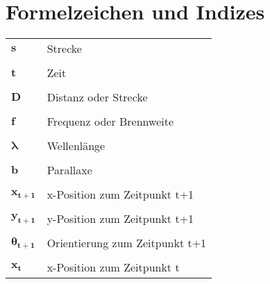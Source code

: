 \documentclass[12pt,a4paper]{scrreprt}
\begin{document}
\newpage


\section*{Formelzeichen und Indizes}
\begin{longtable}[l]{p{2cm} l}

$\boldsymbol{s}$                & Strecke	                                        \\
					            &									                \\
$\boldsymbol{t}$                & Zeit                                              \\
					            &									                \\
$\boldsymbol{D}$                & Distanz oder Strecke	                            \\
					            &									                \\
$\boldsymbol{f}$                & Frequenz oder Brennweite	                        \\
					            &									                \\
$\boldsymbol{\lambda}$          & Wellenlänge                                       \\
					            &									                \\
$\boldsymbol{b}$                & Parallaxe                                         \\
					            &									                \\
$\boldsymbol{x_{t+1}}$          & x-Position zum Zeitpunkt t+1	                    \\
					            &									                \\
$\boldsymbol{y_{t+1}}$          & y-Position zum Zeitpunkt t+1	                    \\
					            &									                \\
$\boldsymbol{\theta_{t+1}}$     & Orientierung zum Zeitpunkt t+1	                \\
					            &									                \\
$\boldsymbol{x_{t}}$            & x-Position zum Zeitpunkt t	                    \\

\end{longtable}
\end{document}
